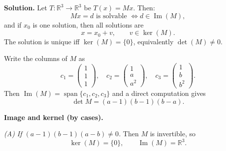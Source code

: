 \documentclass[12pt,a4paper]{article}
\theoremstyle{plain}
\theoremstyle{definition}      %
\begin{document}
\textbf{Solution.}
Let \(T:\mathbb R^3\to\mathbb R^3\) be \(T(x)=Mx\). Then:
\[
Mx=d \text{ is solvable } \Longleftrightarrow d\in \operatorname{Im}(M),
\]
and if \(x_0\) is one solution, then all solutions are
\[
x=x_0+v,\qquad v\in\ker(M).
\]
The solution is unique iff \(\ker(M)=\{0\}\), equivalently \(\det(M)\neq 0\).

Write the columns of \(M\) as
\[
c_1=\begin{pmatrix}1\\1\\1\end{pmatrix},\quad
c_2=\begin{pmatrix}1\\a\\a^2\end{pmatrix},\quad
c_3=\begin{pmatrix}1\\b\\b^2\end{pmatrix}.
\]
Then \(\operatorname{Im}(M)=\operatorname{span}\{c_1,c_2,c_3\}\) and a direct computation gives
\[
\det M=(a-1)(b-1)(b-a).
\]

\textbf{Image and kernel (by cases).}

\emph{(A) If \((a-1)(b-1)(a-b)\neq 0\).}
Then \(M\) is invertible, so
\[
\ker(M)=\{0\},\qquad \operatorname{Im}(M)=\mathbb R^3.
\]
\end{document}
